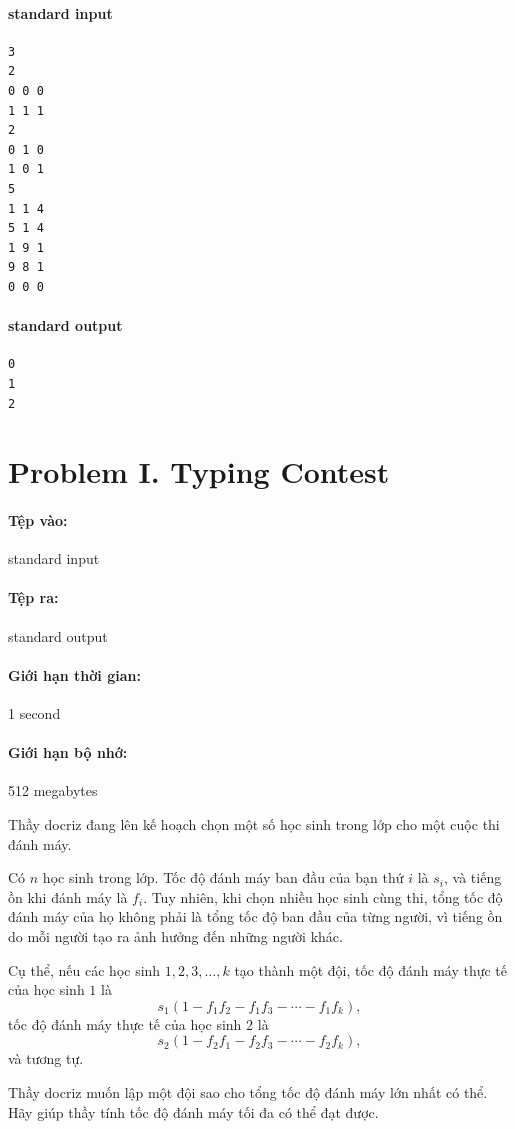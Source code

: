 \documentclass[11pt]{article}
\begin{document}
\paragraph{standard input}
\begin{verbatim}
3
2
0 0 0
1 1 1
2
0 1 0
1 0 1
5
1 1 4
5 1 4
1 9 1
9 8 1
0 0 0
\end{verbatim}

\paragraph{standard output}
\begin{verbatim}
0
1
2
\end{verbatim}

\section{Problem I. Typing Contest}

\paragraph{Tệp vào:} standard input
\paragraph{Tệp ra:} standard output
\paragraph{Giới hạn thời gian:} 1 second
\paragraph{Giới hạn bộ nhớ:} 512 megabytes

Thầy docriz đang lên kế hoạch chọn một số học sinh trong lớp cho một cuộc thi
đánh máy.

Có \(n\) học sinh trong lớp. Tốc độ đánh máy ban đầu của bạn thứ \(i\) là
\(s_i\), và tiếng ồn khi đánh máy là \(f_i\). Tuy nhiên, khi chọn nhiều học
sinh cùng thi, tổng tốc độ đánh máy của họ không phải là tổng tốc độ ban đầu
của từng người, vì tiếng ồn do mỗi người tạo ra ảnh hưởng đến những người
khác.

Cụ thể, nếu các học sinh \(1,2,3,\ldots,k\) tạo thành một đội, tốc độ đánh
máy thực tế của học sinh \(1\) là
\[
  s_1(1-f_1f_2-f_1f_3-\cdots-f_1f_k),
\]
tốc độ đánh máy thực tế của học sinh \(2\) là
\[
  s_2(1-f_2f_1-f_2f_3-\cdots-f_2f_k),
\]
và tương tự.

Thầy docriz muốn lập một đội sao cho tổng tốc độ đánh máy lớn nhất có thể.
Hãy giúp thầy tính tốc độ đánh máy tối đa có thể đạt được.
\end{document}
